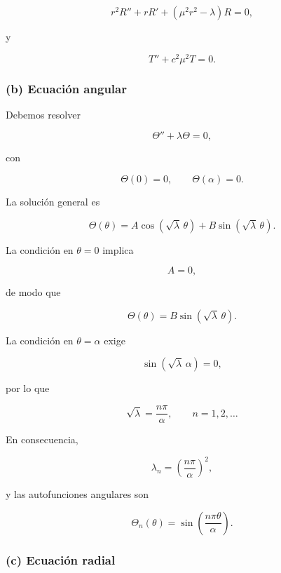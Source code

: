 \documentclass[12pt]{article}
\begin{document}
\begin{equation}
\boxed{
r^2R''
+rR'
+
(\mu^2r^2-\lambda)R=0,
}
\end{equation}

y

\begin{equation}
\boxed{
T''+c^2\mu^2T=0.
}
\end{equation}

\subsubsection*{(b) Ecuación angular}

Debemos resolver

\begin{equation}
\Theta''+\lambda\Theta=0,
\end{equation}

con

\[
\Theta(0)=0,
\qquad
\Theta(\alpha)=0.
\]

La solución general es

\[
\Theta(\theta)
=
A\cos(\sqrt{\lambda}\,\theta)
+
B\sin(\sqrt{\lambda}\,\theta).
\]

La condición en $\theta=0$ implica

\[
A=0,
\]

de modo que

\[
\Theta(\theta)
=
B
\sin(\sqrt{\lambda}\,\theta).
\]

La condición en $\theta=\alpha$ exige

\[
\sin(\sqrt{\lambda}\,\alpha)=0,
\]

por lo que

\begin{equation}
\sqrt{\lambda}
=
\frac{n\pi}{\alpha},
\qquad
n=1,2,\ldots
\end{equation}

En consecuencia,

\begin{equation}
\boxed{
\lambda_n
=
\left(
\frac{n\pi}{\alpha}
\right)^2,
}
\end{equation}

y las autofunciones angulares son

\begin{equation}
\boxed{
\Theta_n(\theta)
=
\sin
\left(
\frac{n\pi\theta}{\alpha}
\right).
}
\end{equation}

\subsubsection*{(c) Ecuación radial}
\end{document}

